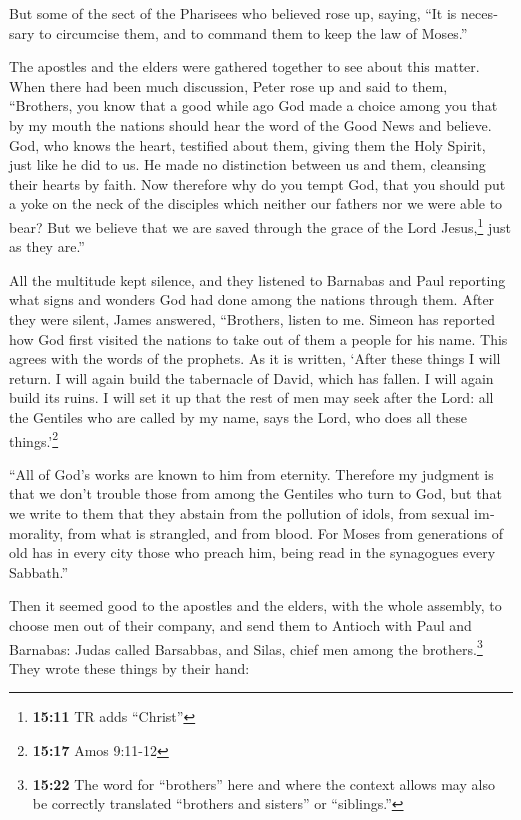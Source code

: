 \begin{paracol}{2}
\begin{otherlanguage}{english}
 But some of the sect of the Pharisees who believed rose
up, saying, ``It is necessary to circumcise them, and to command them to
keep the law of Moses.''

 The apostles and the elders were gathered together to see
about this matter.  When there had been much discussion,
Peter rose up and said to them, ``Brothers, you know that a good while
ago God made a choice among you that by my mouth the nations should hear
the word of the Good News and believe.  God, who knows the
heart, testified about them, giving them the Holy Spirit, just like he
did to us.  He made no distinction between us and them,
cleansing their hearts by faith.  Now therefore why do
you tempt God, that you should put a yoke on the neck of the disciples
which neither our fathers nor we were able to bear?  But
we believe that we are saved through the grace of the Lord
Jesus,\footnote{\textbf{15:11} TR adds ``Christ''} just as they are.''

 All the multitude kept silence, and they listened to
Barnabas and Paul reporting what signs and wonders God had done among
the nations through them.  After they were silent, James
answered, ``Brothers, listen to me.  Simeon has reported
how God first visited the nations to take out of them a people for his
name.  This agrees with the words of the prophets. As it
is written,  `After these things I will return. I will
again build the tabernacle of David, which has fallen. I will again
build its ruins. I will set it up  that the rest of men
may seek after the Lord: all the Gentiles who are called by my name,
says the Lord, who does all these things.'\footnote{\textbf{15:17} Amos
  9:11-12}

 ``All of God's works are known to him from eternity.
 Therefore my judgment is that we don't trouble those
from among the Gentiles who turn to God,  but that we
write to them that they abstain from the pollution of idols, from sexual
immorality, from what is strangled, and from blood.  For
Moses from generations of old has in every city those who preach him,
being read in the synagogues every Sabbath.''

 Then it seemed good to the apostles and the elders, with
the whole assembly, to choose men out of their company, and send them to
Antioch with Paul and Barnabas: Judas called Barsabbas, and Silas, chief
men among the brothers.\footnote{\textbf{15:22} The word for
  ``brothers'' here and where the context allows may also be correctly
  translated ``brothers and sisters'' or ``siblings.''} 
They wrote these things by their hand:


\end{otherlanguage}
\end{paracol}
